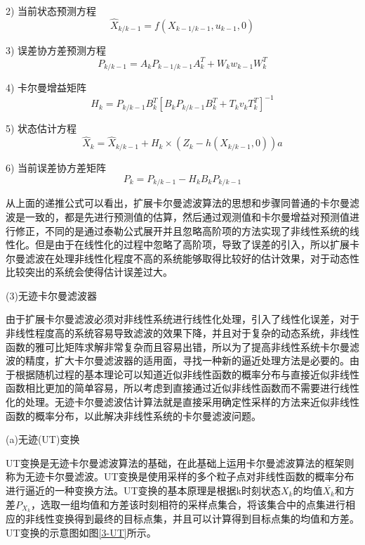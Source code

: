 2) 当前状态预测方程
\begin{equation}
{{\widehat{X}}_{k/k-1}}=f\left( {{X}_{k-1/k-1}},{{u}_{k-1}},0 \right)
\end{equation}

3) 误差协方差预测方程
\begin{equation}
{{P}_{k/k-1}}={{A}_{k}}{{P}_{k-1/k-1}}A_{k}^{T}+{{W}_{k}}{{w}_{k-1}}W_{k}^{T}
\end{equation}  

4) 卡尔曼增益矩阵
\begin{equation}
{{H}_{k}}={{P}_{k/k-1}}B_{k}^{T}{{[{{B}_{k}}{{P}_{k/k-1}}B_{k}^{T}+{{T}_{k}}{{v}_{k}}T_{k}^{T}]}^{-1}}
\end{equation}  
	  
5) 状态估计方程
\begin{equation}
{{\widehat{X}}_{k}}={{\widehat{X}}_{k/k-1}}+{{H}_{k}}\times \left( {{Z}_{k}}-h\left( {{X}_{k/k-1}},0 \right) \right)a
\end{equation}  
	  
6) 当前误差协方差矩阵
\begin{equation}
{{P}_{k}}={{P}_{k/k-1}}-{{H}_{k}}{{B}_{k}}{{P}_{k/k-1}}
\end{equation}  

从上面的递推公式可以看出，扩展卡尔曼滤波算法的思想和步骤同普通的卡尔曼滤波是一致的，都是先进行预测值的估算，然后通过观测值和卡尔曼增益对预测值进行修正，不同的是通过泰勒公式展开并且忽略高阶项的方法实现了非线性系统的线性化。但是由于在线性化的过程中忽略了高阶项，导致了误差的引入，所以扩展卡尔曼滤波在处理非线性化程度不高的系统能够取得比较好的估计效果，对于动态性比较突出的系统会使得估计误差过大。

(3){无迹卡尔曼滤波器}

由于扩展卡尔曼滤波必须对非线性系统进行线性化处理，引入了线性化误差，对于非线性程度高的系统容易导致滤波的效果下降，并且对于复杂的动态系统，非线性函数的雅可比矩阵求解非常复杂而且容易出错，所以为了提高非线性系统卡尔曼滤波的精度，扩大卡尔曼滤波器的适用面，寻找一种新的逼近处理方法是必要的。由于根据随机过程的基本理论可以知道近似非线性函数的概率分布与直接近似非线性函数相比更加的简单容易，所以考虑到直接通过近似非线性函数而不需要进行线性化的处理。无迹卡尔曼滤波估计算法就是直接采用确定性采样的方法来近似非线性函数的概率分布，以此解决非线性系统的卡尔曼滤波问题。

(a)无迹(UT)变换

	UT变换是无迹卡尔曼滤波算法的基础，在此基础上运用卡尔曼滤波算法的框架则称为无迹卡尔曼滤波。UT变换是使用采样的多个粒子点对非线性函数的概率分布进行逼近的一种变换方法。UT变换的基本原理是根据k时刻状态${{X}_{k}}$的均值$\overline{{{X}_{k}}}$和方差${{P}_{{{X}_{k}}}}$，选取一组均值和方差该时刻相符的采样点集合，将该集合中的点集进行相应的非线性变换得到最终的目标点集，并且可以计算得到目标点集的均值和方差。 UT变换的示意图如图\ref{3-UT}所示。

